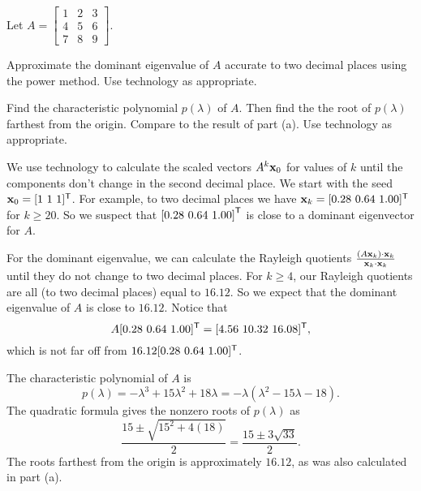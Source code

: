 \begin{example} Let $A = \left[ \begin{array}{ccc} 1&2&3\\4&5&6\\7&8&9 \end{array} \right]$.
\ba
\item Approximate the dominant eigenvalue of $A$ accurate to two decimal places using the power method. Use technology as appropriate.

\item Find the characteristic polynomial $p(\lambda)$ of $A$. Then find the the root of $p(\lambda)$ farthest from the origin. Compare to the result of part (a). Use technology as appropriate.

\ea

\ExampleSolution
\ba
\item We use technology to calculate the scaled vectors $A^k \mathbf{x}_0$ for values of $k$ until the components don't change in the second decimal place. We start with the seed $\vx_0 = [1 \ 1 \ 1]^{\tr}$. For example, to two decimal places we have $\mathbf{x}_k = [0.28 \ 0.64 \ 1.00]^{\mathsf{T}}$ for $k  \geq 20$. So we suspect that $\left[ 0.28 \ 0.64 \ 1.00 \right]^{\mathsf{T}}$ is close to a dominant eigenvector for $A$. 

For the dominant eigenvalue, we can calculate the Rayleigh quotients $\frac{(A\mathbf{x}_k) \cdot \mathbf{x}_k}{\mathbf{x}_k \cdot \mathbf{x}_k}$ until they do not change to two decimal places. For $k \geq 4$, our Rayleigh quotients are all (to two decimal places) equal to $16.12$. So we expect that the dominant eigenvalue of $A$ is close to $16.12$. Notice that 
\[A [0.28 \ 0.64 \ 1.00]^{\mathsf{T}} =  [4.56 \ 10.32 \ 16.08]^{\mathsf{T}},\]
which is not far off from $16.12 [0.28 \ 0.64 \ 1.00]^{\mathsf{T}}$. 

\item The characteristic polynomial of $A$ is 
\[p(\lambda) =-\lambda^3 + 15 \lambda^2 + 18 \lambda = -\lambda(\lambda^2-15\lambda-18).\]
The quadratic formula gives the nonzero roots of $p(\lambda)$ as 
\[\frac{15 \pm \sqrt{15^2 + 4(18)}}{2} = \frac{15 \pm 3\sqrt{33}}{2}.\]
The roots farthest from the origin is approximately $16.12$, as was also calculated in part (a).  
\ea

\end{example}


